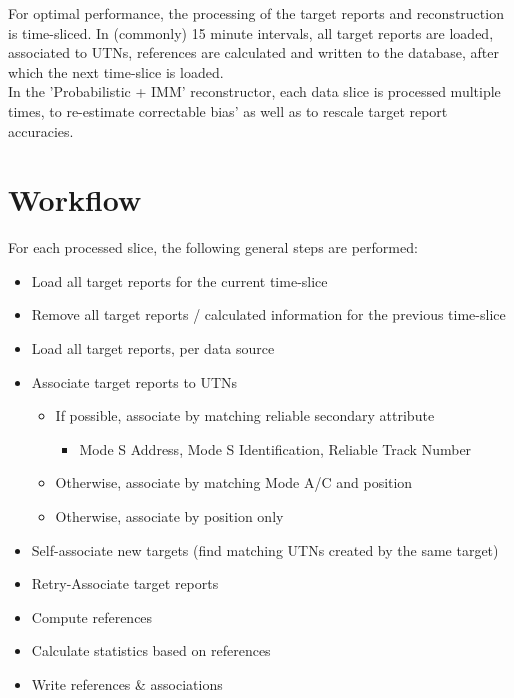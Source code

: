 For optimal performance, the processing of the target reports and reconstruction is time-sliced. In (commonly) 15 minute intervals, all target reports are loaded, associated to UTNs, references are calculated and written to the database, after which the next time-slice is loaded. \\

In the 'Probabilistic + IMM' reconstructor, each data slice is processed multiple times, to re-estimate correctable bias' as well as to rescale target report accuracies. \\



\section{Workflow}
For each processed slice, the following general steps are performed:

\begin{itemize}
\item Load all target reports for the current time-slice
\item Remove all target reports / calculated information for the previous time-slice
\item Load all target reports, per data source
\item Associate target reports to UTNs
   \begin{itemize}  
   \item If possible, associate by matching reliable secondary attribute
    \begin{itemize}  
    \item Mode S Address, Mode S Identification, Reliable Track Number
    \end{itemize}
   \item Otherwise, associate by matching Mode A/C and position
   \item Otherwise, associate by position only
   \end{itemize}
\item Self-associate new targets (find matching UTNs created by the same target)
\item Retry-Associate target reports
\item Compute references
\item Calculate statistics based on references
\item Write references \& associations
\end{itemize}
\ \\

